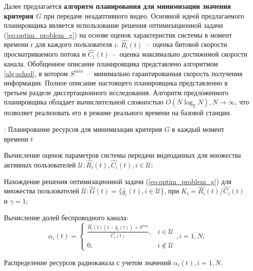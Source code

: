 Далее предлагается \textbf{алгоритм планирования для минимизации значения критерия $G$} при передаче неадаптивного видео. Основной идеей предлагаемого планировщика является использование решения оптимизационной задачи (\ref{eq:optim_problem_g}) на основе оценок характеристик системы в момент времени $t$ для каждого пользователя $i$: $\hat{R_i}(t)$~--~оценка битовой скорости просматриваемого потока и $\hat{C_i}(t)$~--~оценка максимально достижимой скорости канала.
Обобщенное описание планировщика представлено алгоритмом \ref{alg:sched}, в котором $S^{min}$~--~минимально гарантированная скорость получения информации. Полное описание настоящего планировщика представленно в третьем разделе диссертационного исследования. Алгоритм предложенного планировщика обладает вычислительной сложностью $O(N \log_{2}N), N \to \infty$, что позволяет реализовать его в режиме реального времени на базовой станции.
\begin{algorithm}
  \caption{: Планирование ресурсов для минимизации критерия $G$ в каждый момент времени $t$}
	\label{alg:sched}
  \begin{algorithmic}[1]
	\item Вычисление оценок параметров системы передачи видеоданных для множества активных пользователей $\mathcal{U}: \hat{R_i}(t), \hat{C_i}(t), i \in \mathcal{U}$;
	\item Нахождение решения оптимизационной задачи (\ref{eq:optim_problem_g}) для множества пользователей $\mathcal{U}:\hat{G}(t) = \{\hat{g}_i(t), i \in \mathcal{U}\}$, при $K_i = \hat{R_i}(t) / \hat{C_i}(t)$ и $\gamma = 1$;
	\item Вычисление долей беспроводного канала:$$\alpha_i(t) = \begin{cases}
					\frac{\hat{R_i}(t) (1 - \hat{g}_i(t)) + S^{min}}{\hat{C_i}(t)}, & i \in \mathcal{U} \\
					0, & i \notin \mathcal{U}
					\end{cases}, i = \overline{1,N};$$
	\item Распределение ресурсов радиоканала с учетом значений $\alpha_i(t), i = \overline{1,N}$.
  \end{algorithmic}
\end{algorithm}

